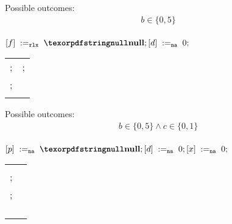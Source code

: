 \begin{minipage}[t]{0.3\linewidth}
Possible outcomes:\\
\[\begin{array}{l}
b \in \{0, 5\} \\
\end{array}\]
\end{minipage}
%
\codePrefix
  $\writeInstParam{\rlx}{f}{\nullPtr}; \writeInstParam{\na}{d}{0};$ \\
  \begin{tabular}{L || L}
    ;  & ; \\
    ; &
      \begin{array}{@{}l}
        {}
        {} \\
      \end{array}
  \end{tabular}
\codePostfix
\litmusTestEnd

\begin{minipage}[t]{0.3\linewidth}
Possible outcomes:\\
\[\begin{array}{l}
b \in \{0, 5\} \land c \in \{0, 1\} \\
\end{array}\]
\end{minipage}
%
\codePrefix
  $\writeInstParam{\na}{p}{\nullPtr}; \writeInstParam{\na}{d}{0};
   \writeInstParam{\na}{x}{0};$ \\
  \begin{tabular}{L || L}
    \begin{array}{@{}l}
      ; \\
      ; \\
      ; \\
    \end{array}
    &
    \begin{array}{@{}l}
     ; \\
      \begin{array}{@{}l}
        {; \\
         }
        {; } \\
      \end{array}
    \end{array}

  \end{tabular}
\codePostfix
\litmusTestEnd

